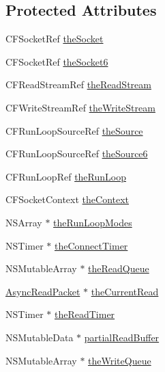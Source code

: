 \subsection*{Protected Attributes}
\begin{DoxyCompactItemize}
\item 
CFSocketRef \hyperlink{interface_async_t_c_p_socket_afd7bd1b4130d08f2fbe8621b08eb69ab}{theSocket}
\item 
CFSocketRef \hyperlink{interface_async_t_c_p_socket_a94c7d0086b3d4a9495e0ef87bca42a22}{theSocket6}
\item 
CFReadStreamRef \hyperlink{interface_async_t_c_p_socket_ad218c2f4f2900c520d97818aff0365c1}{theReadStream}
\item 
CFWriteStreamRef \hyperlink{interface_async_t_c_p_socket_aec37f271ac2a31efa3a76b450c550002}{theWriteStream}
\item 
CFRunLoopSourceRef \hyperlink{interface_async_t_c_p_socket_a802a0e3f2294d4bb644f44e1cd8dfbbd}{theSource}
\item 
CFRunLoopSourceRef \hyperlink{interface_async_t_c_p_socket_afa4beb0b77a9fc1de8e37e665ef8ab99}{theSource6}
\item 
CFRunLoopRef \hyperlink{interface_async_t_c_p_socket_a0df4eb574cfbcba161dc7589f8e9913e}{theRunLoop}
\item 
CFSocketContext \hyperlink{interface_async_t_c_p_socket_a87c18d99a5efbb5389832677241c01e9}{theContext}
\item 
NSArray $\ast$ \hyperlink{interface_async_t_c_p_socket_a12b4b7a67bd7a3c4a03a95117020aee4}{theRunLoopModes}
\item 
NSTimer $\ast$ \hyperlink{interface_async_t_c_p_socket_a72c2c05d0e082afbaa45249b504bfc39}{theConnectTimer}
\item 
NSMutableArray $\ast$ \hyperlink{interface_async_t_c_p_socket_a85c9e429b90f304a6ce8b91913332447}{theReadQueue}
\item 
\hyperlink{interface_async_read_packet}{AsyncReadPacket} $\ast$ \hyperlink{interface_async_t_c_p_socket_a714c81240b36f60805ad3b26ad0a6ab5}{theCurrentRead}
\item 
NSTimer $\ast$ \hyperlink{interface_async_t_c_p_socket_aea6adb1bfaf69917a47a7dcdc65863e0}{theReadTimer}
\item 
NSMutableData $\ast$ \hyperlink{interface_async_t_c_p_socket_a2c92583ab159460443b3d9b73b2b4156}{partialReadBuffer}
\item 
NSMutableArray $\ast$ \hyperlink{interface_async_t_c_p_socket_a857acc35e8665476b20d0355761e8b08}{theWriteQueue}

\end{DoxyCompactItemize}
